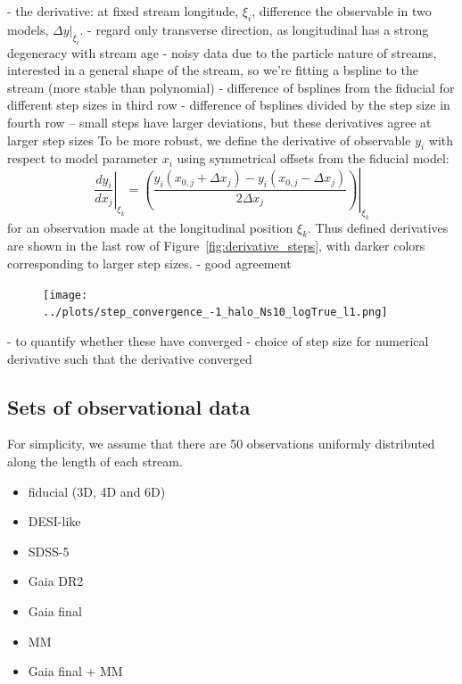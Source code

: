\documentclass[modern]{aastex61}
\begin{document}
- the derivative: at fixed stream longitude, $\xi_i$, difference the observable in two models, $\Delta y|_{\xi_i}$.
- regard only transverse direction, as longitudinal has a strong degeneracy with stream age
- noisy data due to the particle nature of streams, interested in a general shape of the stream, so we're fitting a bspline to the stream (more stable than polynomial)
- difference of bsplines from the fiducial for different step sizes in third row
- difference of bsplines divided by the step size in fourth row -- small steps have larger deviations, but these derivatives agree at larger step sizes
To be more robust, we define the derivative of observable $y_i$ with respect to model parameter $x_i$ using symmetrical offsets from the fiducial model:
\begin{equation}
\left.\frac{d y_i}{d x_j}\right\rvert_{\xi_k} = \left.\left(\frac{y_i(x_{0,j} + \Delta x_j) - y_i(x_{0,j} - \Delta x_j)}{2\Delta x_j}\right)\right\rvert_{\xi_k}
\label{eq:derivative}
\end{equation}
for an observation made at the longitudinal position $\xi_k$.
Thus defined derivatives are shown in the last row of Figure~\ref{fig:derivative_steps}, with darker colors corresponding to larger step sizes.
- good agreement

\begin{figure}
\begin{center}
\texttt{[image: ../plots/step\_convergence\_-1\_halo\_Ns10\_logTrue\_l1.png]}
\caption{
}
\label{fig:derivative_conv}
\end{center}
\end{figure}

- to quantify whether these have converged
- choice of step size for numerical derivative such that the derivative converged

\subsection{Sets of observational data}
For simplicity, we assume that there are 50 observations uniformly distributed along the length of each stream.


\label{sec:datasets}
\begin{itemize}
 \item fiducial (3D, 4D and 6D)
 \item DESI-like
 \item SDSS-5
 \item Gaia DR2
 \item Gaia final
 \item MM
 \item Gaia final + MM
\end{itemize}
\end{document}
